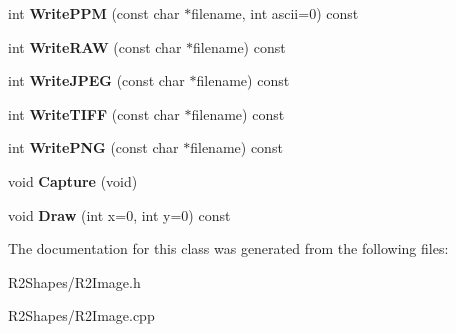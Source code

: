 \begin{DoxyCompactItemize}
\item 
int {\bfseries Write\+P\+PM} (const char $\ast$filename, int ascii=0) const \hypertarget{class_r2_image_a0227076fd833358ecc46764aff6240c3}{}\label{class_r2_image_a0227076fd833358ecc46764aff6240c3}

\item 
int {\bfseries Write\+R\+AW} (const char $\ast$filename) const \hypertarget{class_r2_image_aa67a3840723b143d675f551a80e9c9fa}{}\label{class_r2_image_aa67a3840723b143d675f551a80e9c9fa}

\item 
int {\bfseries Write\+J\+P\+EG} (const char $\ast$filename) const \hypertarget{class_r2_image_a913d2cd462ad0438950bac5f637f18d7}{}\label{class_r2_image_a913d2cd462ad0438950bac5f637f18d7}

\item 
int {\bfseries Write\+T\+I\+FF} (const char $\ast$filename) const \hypertarget{class_r2_image_a0b25022339c4701b19f1e2c458d0e5bb}{}\label{class_r2_image_a0b25022339c4701b19f1e2c458d0e5bb}

\item 
int {\bfseries Write\+P\+NG} (const char $\ast$filename) const \hypertarget{class_r2_image_a09ab00276d8e9f2c8872d86193faf0a9}{}\label{class_r2_image_a09ab00276d8e9f2c8872d86193faf0a9}

\item 
void {\bfseries Capture} (void)\hypertarget{class_r2_image_a57142b697015148a0706e6dd1102e55e}{}\label{class_r2_image_a57142b697015148a0706e6dd1102e55e}

\item 
void {\bfseries Draw} (int x=0, int y=0) const \hypertarget{class_r2_image_a81e93565741ba1af5abcc52b6fedb788}{}\label{class_r2_image_a81e93565741ba1af5abcc52b6fedb788}

\end{DoxyCompactItemize}


The documentation for this class was generated from the following files\+:\begin{DoxyCompactItemize}
\item 
R2\+Shapes/R2\+Image.\+h\item 
R2\+Shapes/R2\+Image.\+cpp\end{DoxyCompactItemize}
